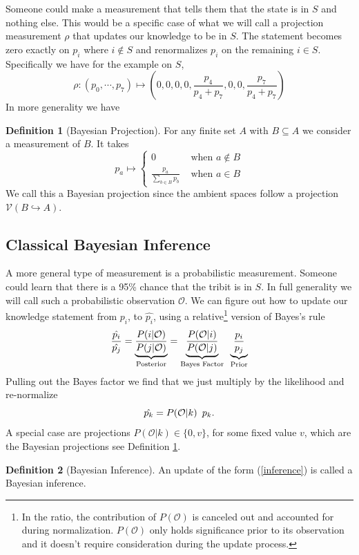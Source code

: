 \documentclass[12pt,a4paper]{article}
\theoremstyle{myrule}
\theoremstyle{postulate}
\theoremstyle{definition}
\newtheorem{definition}{Definition}[section]
\begin{document}
Someone could make a measurement that tells them that the state is in $S$ and nothing else.  This would be a specific case of what we will call a projection measurement $\rho$ that updates our knowledge to be in $S$.  The statement becomes zero exactly on $p_i$ where $i \not \in S$ and renormalizes $p_i$ on the remaining $i \in S$.  Specifically we have for the example on $S$, 
\begin{equation}
\label{sdist}
\rho: (p_0,\cdots,p_7) \mapsto \left(0,0,0,0, \frac{p_4}{p_4 + p_7},0,0,\frac{p_7}{p_4 + p_7}\right)
\end{equation}
In more generality we have
\begin{definition}[Bayesian Projection]
\label{projdef}
For any finite set $A$ with $B \subseteq A$ we consider a measurement of $B$.  It takes
\[
p_a \mapsto \left\{ \begin{array}{cc} 0 &\text{ when } a \not \in B \\ \frac{p_a}{\sum_{b \in B} p_b} & \text{ when } a \in B \end{array} \right.
\]
We call this a Bayesian projection since the ambient spaces follow a projection $\mathcal{V}(B \hookrightarrow A)$.
\end{definition}
\subsection{Classical Bayesian Inference}
A more general type of measurement is a probabilistic measurement.  Someone could learn that there is a 95\% chance that the tribit is in $S$.  In full generality we will call such a probabilistic observation $\mathcal{O}$.  We can figure out how to update our knowledge statement from $p_i$, to $\hat{p_i}$, using a relative\footnote{In the ratio, the contribution of $P(\mathcal{O})$ is canceled out and accounted for during normalization.  $P(\mathcal{O})$ only holds significance prior to its observation and it doesn't require consideration during the update process.} version of Bayes's rule
\[
  \frac{\hat{p_i}}{\hat{p_j}} = \underbrace{\frac{P(i | \mathcal{O})}{P(j | \mathcal{O})}}_\text{Posterior}
                              = \underbrace{\frac{P(\mathcal{O} | i)}{P(\mathcal{O}|j)}}_\text{Bayes Factor}  \hspace{0.07 in}  \underbrace{\frac{p_i}{p_j}}_\text{Prior}
\]
Pulling out the Bayes factor we find that we just multiply by the likelihood and re-normalize
\begin{equation}
\label{inference}
  \hat{p_k} =  P(\mathcal{O} | k) \hspace{0.07 in} p_k.
\end{equation}
A special case are projections $P(\mathcal{O} | k) \in \{0,v\}$, for some fixed value $v$, which are the  Bayesian projections see Definition \ref{projdef}.
\begin{definition}[Bayesian Inference]
\label{infdef}
  An update of the form (\ref{inference}) is called a Bayesian inference.
\end{definition}
\end{document}
